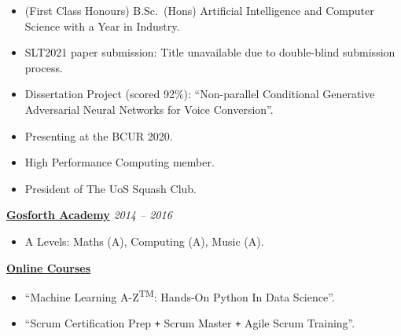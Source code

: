 \documentclass[10pt]{article} %
\begin{document}
\begin{changemargin}{0pt}{0.5pt}
\begin{minipage}[t]{0.44\textwidth}
\begin{changemargin}{5pt}{5pt}
\begin{itemize} \itemsep-2pt %
  \item (First Class Honours) B.Sc.\ (Hons) Artificial Intelligence and Computer Science with a Year in Industry.
  \item SLT2021 paper submission: Title unavailable due to double-blind submission process.
  \item Dissertation Project (scored 92\%): \enquote{Non-parallel Conditional Generative Adversarial Neural Networks for Voice Conversion}.
  \item Presenting at the BCUR 2020.
  \item High Performance Computing member.
  \item President of The UoS Squash Club.
\end{itemize}


\vspace{5pt}
\underline{\textbf{Gosforth Academy}} \hfill \textit{ 2014 --  2016}\\
\par
\vspace{-15pt}

\begin{itemize} \itemsep-2pt %
	\item A Levels: Maths (A), Computing (A), Music (A).
\end{itemize}

	
\vspace{5pt}
\underline{\textbf{Online Courses}}\\
\par
\vspace{-15pt}

\begin{itemize} \itemsep-2pt %
	\item \enquote{Machine Learning A-Z\textsuperscript{TM}: Hands-On Python In Data Science}.
	\item \enquote{Scrum Certification Prep \texttt{+} Scrum Master \texttt{+} Agile Scrum Training}.
\end{itemize}
	

\end{changemargin}
\end{minipage}
\end{changemargin}
\end{document}

